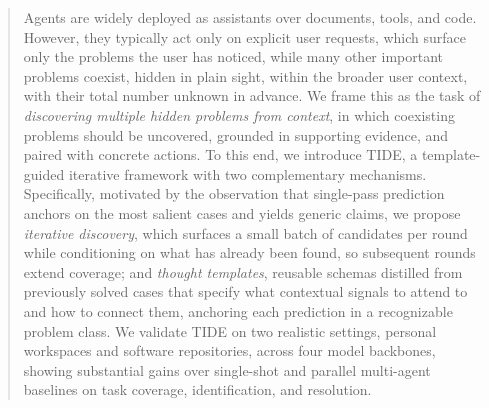 \begin{abstract}
Agents are widely deployed as assistants over documents, tools, and code. However, they typically act only on explicit user requests, which surface only the problems the user has noticed, while many other important problems coexist, hidden in plain sight, within the broader user context, with their total number unknown in advance. We frame this as the task of \textit{discovering multiple hidden problems from context}, in which coexisting problems should be uncovered, grounded in supporting evidence, and paired with concrete actions. To this end, we introduce \textsc{TIDE}, a template-guided iterative framework with two complementary mechanisms. Specifically, motivated by the observation that single-pass prediction anchors on the most salient cases and yields generic claims, we propose \textit{iterative discovery}, which surfaces a small batch of candidates per round while conditioning on what has already been found, so subsequent rounds extend coverage; and \textit{thought templates}, reusable schemas distilled from previously solved cases that specify what contextual signals to attend to and how to connect them, anchoring each prediction in a recognizable problem class. We validate \textsc{TIDE} on two realistic settings, personal workspaces and software repositories, across four model backbones, showing substantial gains over single-shot and parallel multi-agent baselines on task coverage, identification, and resolution.
\end{abstract}
